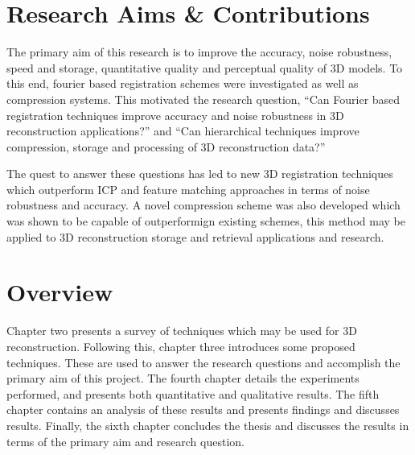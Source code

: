 \section{Research Aims \& Contributions}

The primary aim of this research is to improve the accuracy, noise robustness, speed and storage, quantitative quality and perceptual quality of 3D models. To this end, fourier based registration schemes were investigated as well as compression systems. This motivated the research question, ``Can Fourier based registration techniques improve accuracy and noise robustness in 3D reconstruction applications?'' and ``Can hierarchical techniques improve compression, storage and processing of 3D reconstruction data?'' 

The quest to answer these questions has led to new 3D registration techniques \cite{Lincoln13Interpolating} which outperform ICP and feature matching approaches in terms of noise robustness and accuracy. A novel compression scheme was also developed which was shown to be capable of outperformign existing schemes, this method may be applied to 3D reconstruction storage and retrieval applications and research.

\section{Overview}

Chapter two presents a survey of techniques which may be used for 3D reconstruction. Following this, chapter three introduces some proposed techniques. These are used to answer the research questions and accomplish the primary aim of this project. The fourth chapter details the experiments performed, and presents both quantitative and qualitative results. The fifth chapter contains an analysis of these results and presents findings and discusses results. Finally, the sixth chapter concludes the thesis and discusses the results in terms of the primary aim and research question. 



